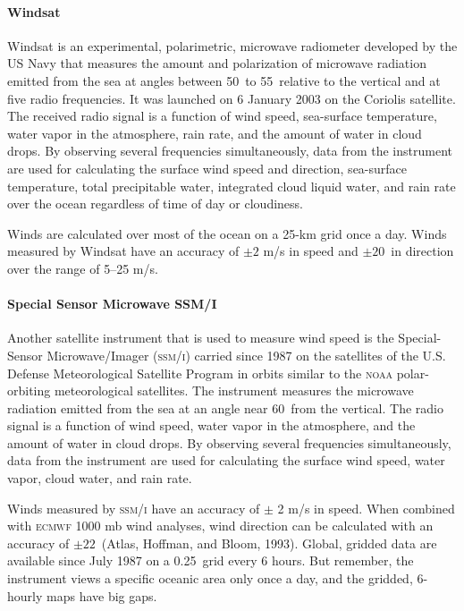 \paragraph{Windsat}
Windsat is an experimental, polarimetric, microwave radiometer developed by the US Navy that measures the amount and polarization of microwave radiation emitted from the sea at angles between 50\degrees\ to 55\degrees\ relative to the vertical and at five radio frequencies. It was launched on 6 January 2003 on the Coriolis satellite. The received radio signal is a function of wind speed, sea-surface temperature, water vapor in the atmosphere, rain rate, and the amount of water in cloud drops. By observing several frequencies simultaneously, data from the instrument are used for calculating the
surface wind speed and direction, sea-surface temperature, total precipitable water, integrated cloud liquid water, and rain rate over the ocean regardless of time of day or cloudiness. 

Winds are calculated over most of the ocean on a 25-km grid once a day. Winds measured by Windsat have an accuracy of $\pm 2$ m/s in speed and $\pm 20$\degrees\ in direction over the range of 5--25 m/s.

\paragraph{Special Sensor Microwave SSM/I}
Another satellite instrument that is used to measure wind speed is the
Special-Sensor Microwave/Imager (\textsc{ssm/i}) carried since 1987 on the
satellites of the U.S. Defense Meteorological Satellite Program in orbits similar
to the \textsc{noaa} polar-orbiting meteorological satellites. The instrument
measures the microwave radiation emitted from the sea at an angle near 60\degrees\
from the vertical. The radio signal is a function of wind speed, water vapor in the
atmosphere, and the amount of water in cloud drops. By observing several
frequencies simultaneously, data from the instrument are used for calculating the
surface wind speed, water vapor, cloud water, and rain rate.

Winds measured by \textsc{ssm/i} have an accuracy of $\pm$ 2 m/s
in speed. When combined with \textsc{ecmwf} 1000 mb wind analyses, wind direction
can be calculated with an accuracy of $\pm 22$\degrees\ (Atlas, Hoffman, and
Bloom, 1993). Global, gridded data are available since July 1987 on a 0.25\degrees\  grid every 6 hours. But remember, the instrument views a specific oceanic area only once a day, and
the gridded, 6-hourly maps have big gaps.

